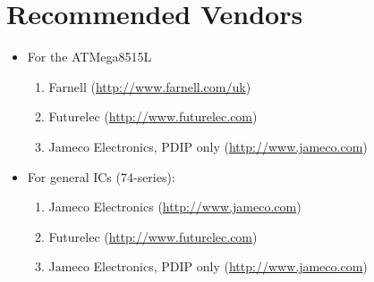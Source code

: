 \chapter{Recommended Vendors}

\begin{itemize}
\item For the ATMega8515L
\begin{enumerate}
	\item Farnell (\url{http://www.farnell.com/uk})
	\item Futurelec (\url{http://www.futurelec.com})
	\item Jameco Electronics, PDIP only (\url{http://www.jameco.com})
\end{enumerate}

\item For general ICs (74-series):
\begin{enumerate}
	\item Jameco Electronics (\url{http://www.jameco.com})
	\item Futurelec (\url{http://www.futurelec.com})
	\item Jameco Electronics, PDIP only (\url{http://www.jameco.com})
\end{enumerate}
\end{itemize}
